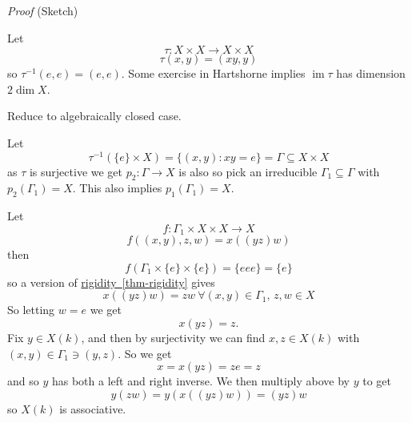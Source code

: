 \documentclass[10pt,]{book}
\makeatletter
\renewcommand*{\proofname}{Proof}
\renewenvironment{proof}[1][\proofname]{\par
  \pushQED{\qed}%
  \normalfont \topsep6\p@\@plus6\p@\relax
  \trivlist
  \item\relax
    {\itshape
    #1\@addpunct{.}}\hspace\labelsep\ignorespaces
}{%
  \popQED\endtrivlist\@endpefalse
}
\numberwithin{equation}{section}
\DeclareMathOperator{\im}{im}
\makeatother
\begin{document}
\begin{proof}\hypertarget{proof-47}{}
\hypertarget{p-285}{}%
(Sketch)%
\par
\hypertarget{p-286}{}%
Let%
\begin{equation*}
\tau\colon X\times X \to X\times X
\end{equation*}
%
\begin{equation*}
\tau(x,y) = (xy,y)
\end{equation*}
so \(\tau^{-1} (e,e) = (e,e)\). Some exercise in Hartshorne implies \(\im \tau\) has dimension \(2\dim X\).%
\par
\hypertarget{p-287}{}%
Reduce to algebraically closed case.%
\par
\hypertarget{p-288}{}%
Let%
\begin{equation*}
\tau^{-1}(\{e\} \times X) =  \{(x,y) : xy = e\} = \Gamma \subseteq X\times X
\end{equation*}
as \(\tau \) is surjective we get \(p_2 \colon \Gamma \to X\) is also so pick an irreducible \(\Gamma_1 \subseteq \Gamma\) with \(p_2(\Gamma_1) = X\). This also implies \(p_1(\Gamma_1) = X\).%
\par
\hypertarget{p-289}{}%
Let%
\begin{equation*}
f\colon \Gamma_1 \times X\times X \to X
\end{equation*}
%
\begin{equation*}
f((x,y),z,w) = x((yz)w)
\end{equation*}
then%
\begin{equation*}
f(\Gamma_1 \times\{e\}\times\{e\}) = \{eee\} = \{e\}
\end{equation*}
so a version of \hyperref[thm-rigidity]{rigidity~\ref{thm-rigidity}} gives%
\begin{equation*}
x((yz)w) = zw\ \forall (x,y) \in \Gamma_1,\,z,w\in X
\end{equation*}
So letting \(w = e\) we get%
\begin{equation*}
x(yz) = z\text{.}
\end{equation*}
Fix \(y \in X(k)\), and then by surjectivity we can find \(x,z \in X(k)\) with \((x,y)\in \Gamma_1 \ni (y,z)\). So we get%
\begin{equation*}
x = x(yz) = ze = z
\end{equation*}
and so \(y\) has both a left and right inverse. We then multiply above by \(y\) to get%
\begin{equation*}
y(zw) = y(x((yz)w)) = (yz)w
\end{equation*}
so \(X(k)\) is associative.%
\end{proof}
\end{document}
